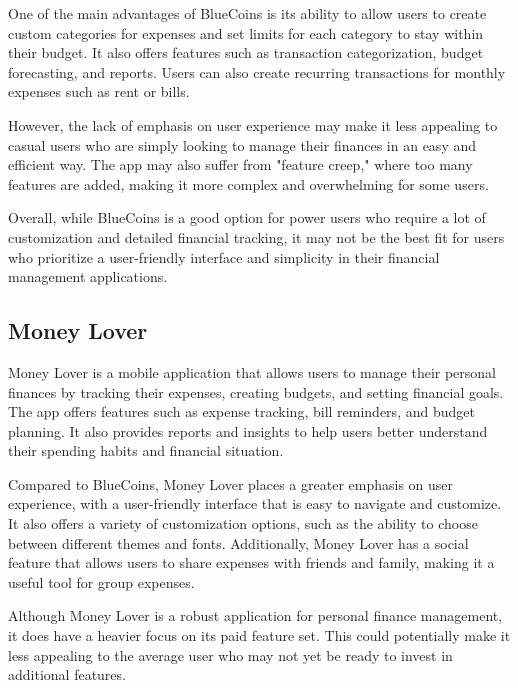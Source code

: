\hspace{\parindent}One of the main advantages of BlueCoins is its ability to allow users to create custom categories for expenses and set limits for each category to stay within their budget. It also offers features such as transaction categorization, budget forecasting, and reports. Users can also create recurring transactions for monthly expenses such as rent or bills.

\hspace{\parindent}However, the lack of emphasis on user experience may make it less appealing to casual users who are simply looking to manage their finances in an easy and efficient way. The app may also suffer from "feature creep," where too many features are added, making it more complex and overwhelming for some users.

\hspace{\parindent}Overall, while BlueCoins is a good option for power users who require a lot of customization and detailed financial tracking, it may not be the best fit for users who prioritize a user-friendly interface and simplicity in their financial management applications.

\subsection{Money Lover}
\hspace{\parindent}Money Lover is a mobile application that allows users to manage their personal finances by tracking their expenses, creating budgets, and setting financial goals. The app offers features such as expense tracking, bill reminders, and budget planning. It also provides reports and insights to help users better understand their spending habits and financial situation.

\hspace{\parindent}Compared to BlueCoins, Money Lover places a greater emphasis on user experience, with a user-friendly interface that is easy to navigate and customize. It also offers a variety of customization options, such as the ability to choose between different themes and fonts. Additionally, Money Lover has a social feature that allows users to share expenses with friends and family, making it a useful tool for group expenses.

\hspace{\parindent}Although Money Lover is a robust application for personal finance management, it does have a heavier focus on its paid feature set. This could potentially make it less appealing to the average user who may not yet be ready to invest in additional features. 


